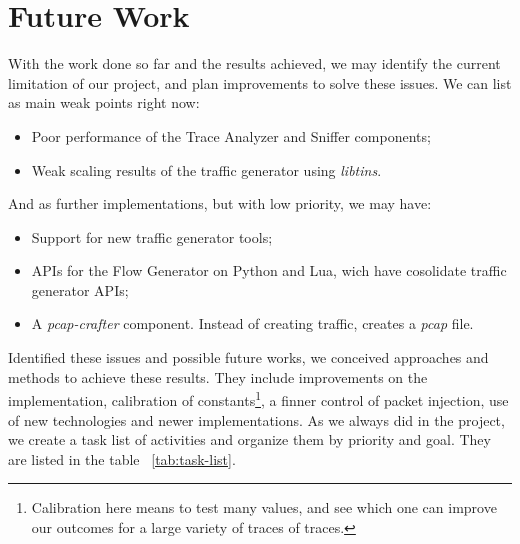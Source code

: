 \chapter{Future Work}\label{ch:future-work-old}


With the work done so far and the results achieved, we may identify the current limitation of our project, and plan improvements to solve these issues. 
We can list as  main weak points right now:

\begin{itemize}
    \item Poor performance of the Trace Analyzer and Sniffer components;
    \item Weak scaling results of the traffic generator using \textit{libtins}.
\end{itemize}

And as further implementations, but with low priority, we may have:

\begin{itemize}
    \item Support for new traffic generator tools;
    \item APIs for the Flow Generator on  Python and Lua, wich have cosolidate traffic generator APIs;
    \item A \textit{pcap-crafter} component. Instead of creating traffic, creates a \textit{pcap} file.
\end{itemize}

Identified these issues and possible future works, we conceived approaches and methods to achieve these results. They include improvements on the implementation,  calibration of constants\footnote{Calibration here means to test many values, and see which one can improve our outcomes for a large variety of traces of traces.}, a finner control of packet injection, use of new technologies and newer implementations. As we always did in the project, we create a task list of activities and organize them by priority and goal. They are listed in the table ~\ref{tab:task-list}.  


